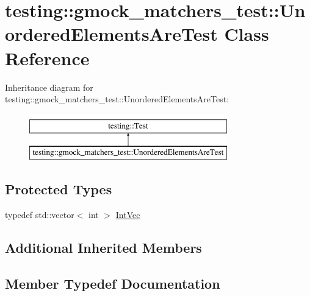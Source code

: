 \hypertarget{classtesting_1_1gmock__matchers__test_1_1UnorderedElementsAreTest}{}\section{testing\+::gmock\+\_\+matchers\+\_\+test\+::Unordered\+Elements\+Are\+Test Class Reference}
\label{classtesting_1_1gmock__matchers__test_1_1UnorderedElementsAreTest}
Inheritance diagram for testing\+::gmock\+\_\+matchers\+\_\+test\+::Unordered\+Elements\+Are\+Test\+:\begin{figure}[H]
\begin{center}
\leavevmode
\includegraphics[height=2.000000cm]{classtesting_1_1gmock__matchers__test_1_1UnorderedElementsAreTest}
\end{center}
\end{figure}
\subsection*{Protected Types}
\begin{DoxyCompactItemize}
\item 
typedef std\+::vector$<$ int $>$ \mbox{\hyperlink{classtesting_1_1gmock__matchers__test_1_1UnorderedElementsAreTest_a608750c71652943bd11fe7bb5281588d}{Int\+Vec}}
\end{DoxyCompactItemize}
\subsection*{Additional Inherited Members}


\subsection{Member Typedef Documentation}
\mbox{\label{classtesting_1_1gmock__matchers__test_1_1UnorderedElementsAreTest_a608750c71652943bd11fe7bb5281588d}} 
